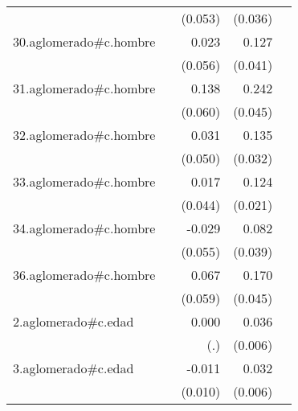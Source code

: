 {\begin{longtable}{l*{4}{D{.}{.}{-1}}}
            &                     &     (0.053)         &     (0.036)         &                     \\
\addlinespace
30.aglomerado#c.hombre&                     &       0.023         &       0.127\sym{**} &                     \\
            &                     &     (0.056)         &     (0.041)         &                     \\
\addlinespace
31.aglomerado#c.hombre&                     &       0.138\sym{*}  &       0.242\sym{***}&                     \\
            &                     &     (0.060)         &     (0.045)         &                     \\
\addlinespace
32.aglomerado#c.hombre&                     &       0.031         &       0.135\sym{***}&                     \\
            &                     &     (0.050)         &     (0.032)         &                     \\
\addlinespace
33.aglomerado#c.hombre&                     &       0.017         &       0.124\sym{***}&                     \\
            &                     &     (0.044)         &     (0.021)         &                     \\
\addlinespace
34.aglomerado#c.hombre&                     &      -0.029         &       0.082\sym{*}  &                     \\
            &                     &     (0.055)         &     (0.039)         &                     \\
\addlinespace
36.aglomerado#c.hombre&                     &       0.067         &       0.170\sym{***}&                     \\
            &                     &     (0.059)         &     (0.045)         &                     \\
\addlinespace
2.aglomerado#c.edad&                     &       0.000         &       0.036\sym{***}&                     \\
            &                     &         (.)         &     (0.006)         &                     \\
\addlinespace
3.aglomerado#c.edad&                     &      -0.011         &       0.032\sym{***}&                     \\
            &                     &     (0.010)         &     (0.006)         &                     \\

\end{longtable}}
